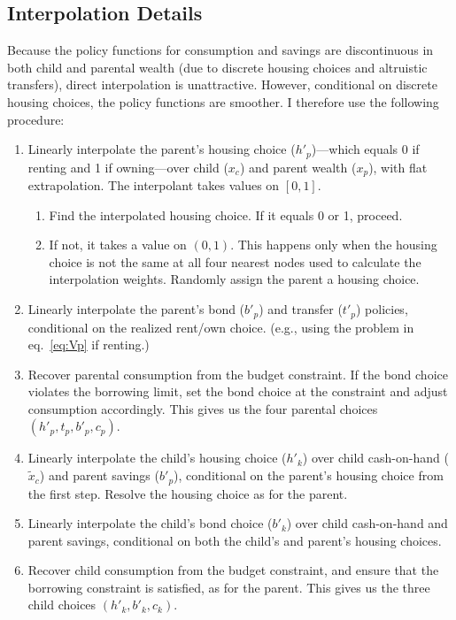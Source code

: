 \documentclass[12pt]{article}
\begin{document}
\subsection{Interpolation Details} Because the policy functions for consumption and savings are discontinuous in both child and parental wealth (due to discrete housing choices and altruistic transfers), direct interpolation is unattractive. However, conditional on discrete housing choices, the policy functions are smoother. I therefore use the following procedure:
\begin{enumerate}
	\item Linearly interpolate the parent's housing choice ($h'_p$)---which equals 0 if renting and 1 if owning---over child ($x_c$) and parent wealth ($x_p$), with flat extrapolation. The interpolant takes values on $[0,1]$.
	\begin{enumerate}
		\item Find the interpolated housing choice. If it equals 0 or 1, proceed.
		\item If not, it takes a value on $(0,1)$. This happens only when the housing choice is not the same at all four nearest nodes used to calculate the interpolation weights. Randomly assign the parent a housing choice.
	\end{enumerate}
	\item Linearly interpolate the parent's bond ($b'_p$) and transfer ($t'_p$) policies, conditional on the realized rent/own choice. (e.g., using the problem in eq.~\ref{eq:Vp} if renting.)
	\item Recover parental consumption from the budget constraint. If the bond choice violates the borrowing limit, set the bond choice at the constraint and adjust consumption accordingly. This gives us the four parental choices $(h'_p,t_p,b'_p,c_p)$.
	
	\item Linearly interpolate the child's housing choice ($h'_k$) over child cash-on-hand ($\tilde x_c$) and parent savings ($b'_p$), conditional on the parent's housing choice from the first step. Resolve the housing choice as for the parent.
	\item Linearly interpolate the child's bond choice ($b'_k$) over child cash-on-hand and parent savings, conditional on both the child's and parent's housing choices.
	\item Recover child consumption from the budget constraint, and ensure that the borrowing constraint is satisfied, as for the parent. This gives us the three child choices $(h'_k,b'_k,c_k)$. 
\end{enumerate}
\end{document}
